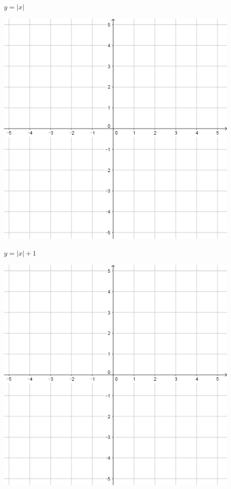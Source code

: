\documentclass[a4paper]{oblivoir}
\begin{document}
\clearpage
\begin{minipage}{0.45\textwidth}\centering
\(y=|x|\)
\par\bigskip\includegraphics[width=0.9\textwidth]{55}
\end{minipage}
\begin{minipage}{0.45\textwidth}\centering
\(y=|x|+1\)
\par\bigskip\includegraphics[width=0.9\textwidth]{55}
\end{minipage}\bigskip\bigskip\par
\end{document}
